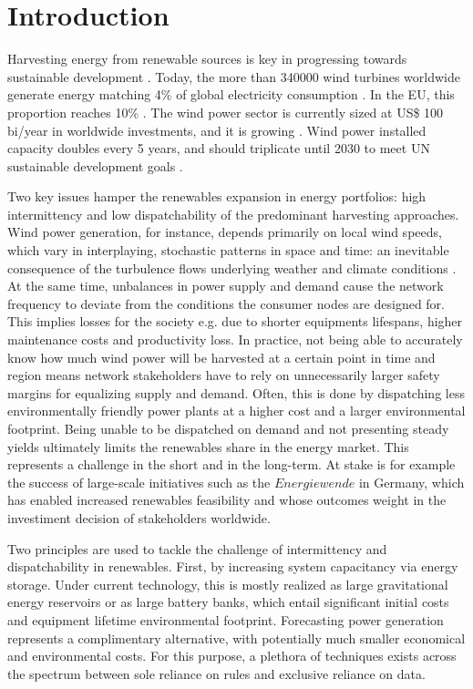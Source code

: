 \chapter{Introduction}
Harvesting energy from renewable sources is key in progressing towards sustainable development \cite{johansson2002energy}.
Today, the more than 340000 wind turbines worldwide generate energy matching 4\% of global electricity consumption \cite{}.
In the EU, this proportion reaches 10\% \cite{}.
The wind power sector is currently sized at US\$ 100 bi/year in worldwide investments, and it is growing \cite{}.
Wind power installed capacity doubles every 5 years, and should triplicate until 2030 to meet UN sustainable development goals \cite{}.

Two key issues hamper the renewables expansion in energy portfolios: high intermittency and low dispatchability of the predominant harvesting approaches.
Wind power generation, for instance, depends primarily on local wind speeds, which vary in interplaying, stochastic patterns in space and time: an inevitable consequence of the turbulence flows underlying weather and climate conditions \cite{pope2001turbulent}.
At the same time, unbalances in power supply and demand cause the network frequency to deviate from the conditions the consumer nodes are designed for.
This implies losses for the society e.g. due to shorter equipments lifespans, higher maintenance costs and productivity loss.
In practice, not being able to accurately know how much wind power will be harvested at a certain point in time and region means network stakeholders have to rely on unnecessarily larger safety margins for equalizing supply and demand.
Often, this is done by dispatching less environmentally friendly power plants at a higher cost and a larger environmental footprint.
Being unable to be dispatched on demand and not presenting steady yields ultimately limits the renewables share in the energy market.
This represents a challenge in the short and in the long-term.
At stake is for example the success of large-scale initiatives such as the $\textit{Energiewende}$ in Germany, which has enabled increased renewables feasibility and whose outcomes weight in the investiment decision of stakeholders worldwide.

Two principles are used to tackle the challenge of intermittency and dispatchability in renewables.
First, by increasing system capacitancy via energy storage.
Under current technology, this is mostly realized as large gravitational energy reservoirs or as large battery banks, which entail significant initial costs and equipment lifetime environmental footprint.
Forecasting power generation represents a complimentary alternative, with potentially much smaller economical and environmental costs.
For this purpose, a plethora of techniques exists across the spectrum between sole reliance on rules and exclusive reliance on data.

